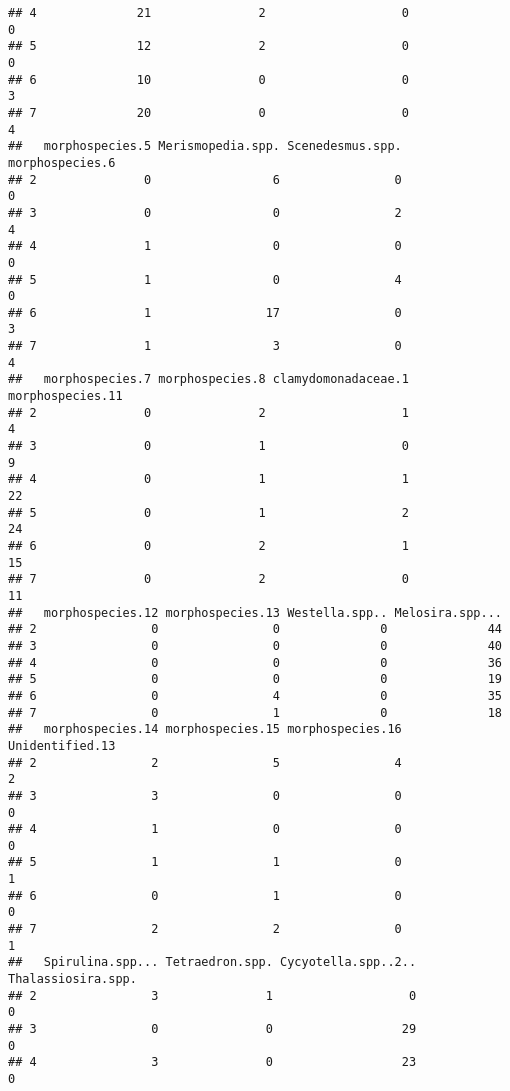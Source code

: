 \documentclass[]{article}
\begin{document}
\begin{verbatim}
## 4              21               2                   0                 0
## 5              12               2                   0                 0
## 6              10               0                   0                 3
## 7              20               0                   0                 4
##   morphospecies.5 Merismopedia.spp. Scenedesmus.spp. morphospecies.6
## 2               0                 6                0               0
## 3               0                 0                2               4
## 4               1                 0                0               0
## 5               1                 0                4               0
## 6               1                17                0               3
## 7               1                 3                0               4
##   morphospecies.7 morphospecies.8 clamydomonadaceae.1 morphospecies.11
## 2               0               2                   1                4
## 3               0               1                   0                9
## 4               0               1                   1               22
## 5               0               1                   2               24
## 6               0               2                   1               15
## 7               0               2                   0               11
##   morphospecies.12 morphospecies.13 Westella.spp.. Melosira.spp...
## 2                0                0              0              44
## 3                0                0              0              40
## 4                0                0              0              36
## 5                0                0              0              19
## 6                0                4              0              35
## 7                0                1              0              18
##   morphospecies.14 morphospecies.15 morphospecies.16 Unidentified.13
## 2                2                5                4               2
## 3                3                0                0               0
## 4                1                0                0               0
## 5                1                1                0               1
## 6                0                1                0               0
## 7                2                2                0               1
##   Spirulina.spp... Tetraedron.spp. Cycyotella.spp..2.. Thalassiosira.spp.
## 2                3               1                   0                  0
## 3                0               0                  29                  0
## 4                3               0                  23                  0

\end{verbatim}
\end{document}
